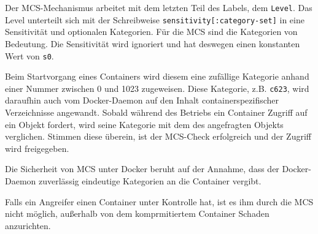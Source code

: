 \documentclass[../main.tex]{subfiles}
\begin{document}
					Der MCS-Mechanismus arbeitet mit dem letzten Teil des Labels, dem \texttt{Level}. Das Level unterteilt sich mit der Schreibweise \texttt{sensitivity[:category-set]} in eine Sensitivität und optionalen Kategorien. Für die MCS sind die Kategorien von Bedeutung. Die Sensitivität wird ignoriert und hat deswegen einen konstanten Wert von \texttt{s0}.

					Beim Startvorgang eines Containers wird diesem eine zufällige Kategorie anhand einer Nummer zwischen 0 und 1023 zugeweisen. Diese Kategorie, z.B. \texttt{c623}, wird daraufhin auch vom Docker-Daemon auf den Inhalt containerspezifischer Verzeichnisse angewandt. Sobald während des Betriebs ein Container Zugriff auf ein Objekt fordert, wird seine Kategorie mit dem des angefragten Objekts verglichen. Stimmen diese überein, ist der MCS-Check erfolgreich und der Zugriff wird freigegeben.

					Die Sicherheit von MCS unter Docker beruht auf der Annahme, dass der Docker-Daemon zuverlässig eindeutige Kategorien an die Container vergibt.

					Falls ein Angreifer einen Container unter Kontrolle hat, ist es ihm durch die MCS nicht möglich, außerhalb von dem komprmitiertem Container Schaden anzurichten.


\end{document}
